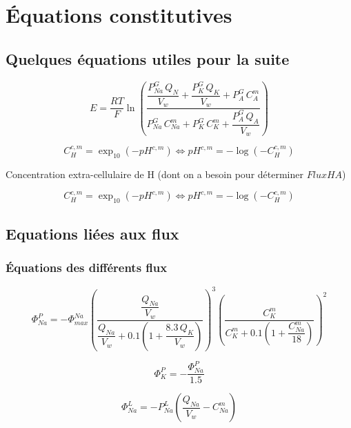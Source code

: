 \documentclass[a4paper,fleqn]{article}
\begin{document}
\section{Équations constitutives}

\subsection{Quelques équations utiles pour la suite}

\begin{equation}
E =  \frac{RT}{F}\ln{\left(\frac{\dfrac{P_{Na}^G\,Q_N}{V_w} + \dfrac{P_K^G\,Q_K}{V_w} + P_A^G\,C_A^m}{P_{Na}^G\,C_{Na}^m + P_K^G\,C_K^m + \dfrac{P_A^G\,Q_A}{V_w}}\right)}
\end{equation}

\begin{equation}
{C_{H}^{c,m}=\exp_{10}{\left(-pH^{c,m}\right)}}\Longleftrightarrow{pH^{c,m}=-\log{\left(-C_{H}^{c,m}\right)}}
\end{equation}

Concentration extra-cellulaire de H (dont on a besoin pour déterminer $FluxHA$)

\begin{equation}
{C_{H}^{c,m}=\exp_{10}{\left(-pH^{c,m}\right)}}\Longleftrightarrow{pH^{c,m}=-\log{\left(-C_{H}^{c,m}\right)}}
\end{equation}

\subsection{Equations liées aux flux}
\subsubsection*{Équations des différents flux}

\begin{equation}
\Phi_{Na}^{P}=-\Phi_{max}^{Na}\left(\frac{\dfrac{Q_{Na}}{V_w}}{\dfrac{Q_{Na}}{V_w} + 0.1\left(1+\dfrac{8.3\,Q_{K}}{V_w}\right)}\right)^3\left(\dfrac{C_{K}^{m}}{C_{K}^{m}+0.1\left(1+\dfrac{C_{Na}^{m}}{18}\right)}\right)^2
\end{equation}

\begin{equation}
\Phi_{K}^{P}=-\frac{\Phi_{Na}^{P}}{1.5}
\end{equation}

\begin{equation}
\Phi_{Na}^{L}=-P_{Na}^{L}\left(\frac{Q_{Na}}{V_w}-C_{Na}^{m}\right)
\end{equation}
\end{document}
